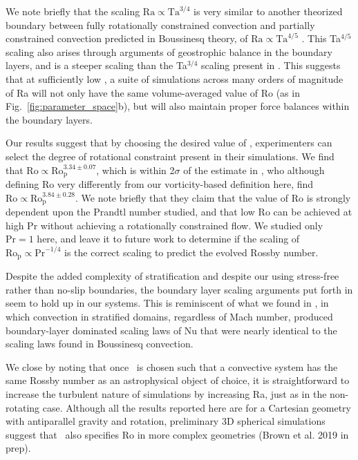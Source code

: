 We note briefly that the scaling $\text{Ra} \propto \text{Ta}^{3/4}$ is very similar to
another theorized boundary between fully rotationally constrained convection and 
partially constrained convection predicted in Boussinesq theory, of 
$\text{Ra} \propto \text{Ta}^{4/5}$ \cite{julien&all2012, gastine&all2016}. This
Ta$^{4/5}$ scaling also arises through arguments of geostrophic balance in the boundary layers,
and is a steeper scaling than the Ta$^{3/4}$ scaling present in \pro.
This suggests that at sufficiently low \pro, a suite of simulations across many orders
of magnitude of Ra will not only have the same volume-averaged value of Ro 
(as in Fig.~\ref{fig:parameter_space}b), but will
also maintain proper force balances within the boundary layers.

Our results suggest that by choosing the desired value of \pro, experimenters
can select the degree of rotational constraint present in their simulations. 
We find that $\text{Ro} \propto \text{Ro}_\text{p}^{3.34 \pm 0.07}$, which is within
2$\sigma$ of the estimate in \cite{king&all2013}, who although defining
Ro very differently from our vorticity-based definition here, find 
$\text{Ro} \propto \text{Ro}_\text{p}^{3.84 \pm 0.28}$. We note briefly that they
claim that the value of $\text{Ro}$ is strongly dependent upon the Prandtl number studied, and
that low Ro can be achieved at high Pr without achieving a rotationally constrained flow.
We studied only $\text{Pr} = 1$ here, and leave it to future work to determine if
the scaling of $\text{Ro}_{\text{p}} \propto \text{Pr}^{-1/4}$ is the correct scaling to
predict the evolved Rossby number.

Despite the added complexity of stratification and despite our using stress-free rather than
no-slip boundaries, the boundary layer scaling arguments put forth in \cite{king&all2012} seem
to hold up in our systems. This is reminiscent of what we found in \AB, in which
convection in stratified domains, regardless of Mach number, produced boundary-layer
dominated scaling laws of Nu that were nearly identical to the scaling laws found in
Boussinesq \RB convection.

We close by noting that once \pro$\,$ is chosen such that a convective system has the same
Rossby number as an astrophysical object of choice, it is straightforward to increase the 
turbulent nature of 
simulations by increasing Ra, just as in the non-rotating case.
Although all the results reported here are for a Cartesian geometry with 
antiparallel gravity and rotation, preliminary 3D spherical simulations suggest that 
\pro$\,$ also specifies Ro in more complex geometries (Brown et al. 2019 in prep).


